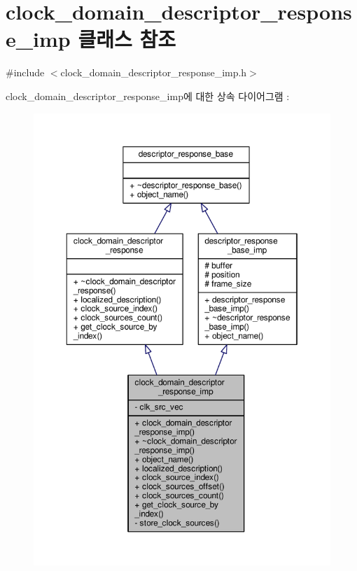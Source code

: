 \hypertarget{classavdecc__lib_1_1clock__domain__descriptor__response__imp}{}\section{clock\+\_\+domain\+\_\+descriptor\+\_\+response\+\_\+imp 클래스 참조}
\label{classavdecc__lib_1_1clock__domain__descriptor__response__imp}


{\ttfamily \#include $<$clock\+\_\+domain\+\_\+descriptor\+\_\+response\+\_\+imp.\+h$>$}



clock\+\_\+domain\+\_\+descriptor\+\_\+response\+\_\+imp에 대한 상속 다이어그램 \+: 
\nopagebreak
\begin{figure}[H]
\begin{center}
\leavevmode
\includegraphics[width=350pt]{classavdecc__lib_1_1clock__domain__descriptor__response__imp__inherit__graph}
\end{center}
\end{figure}


